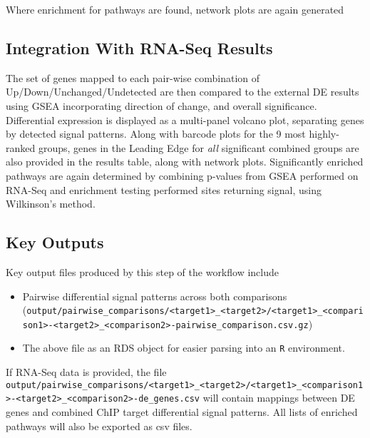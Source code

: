 \documentclass[
]{book}
\providecommand{\tightlist}{%
  \setlength{\itemsep}{0pt}\setlength{\parskip}{0pt}}
\begin{document}
Where enrichment for pathways are found, network plots are again generated

\hypertarget{integration-with-rna-seq-results}{%
\subsection*{Integration With RNA-Seq Results}\label{integration-with-rna-seq-results}}

The set of genes mapped to each pair-wise combination of Up/Down/Unchanged/Undetected are then compared to the external DE results using GSEA incorporating direction of change, and overall significance.
Differential expression is displayed as a multi-panel volcano plot, separating genes by detected signal patterns.
Along with barcode plots for the 9 most highly-ranked groups, genes in the Leading Edge for \emph{all} significant combined groups are also provided in the results table, along with network plots.
Significantly enriched pathways are again determined by combining p-values from GSEA performed on RNA-Seq and enrichment testing performed sites returning signal, using Wilkinson's method.

\hypertarget{key-outputs-2}{%
\subsection{Key Outputs}\label{key-outputs-2}}

Key output files produced by this step of the workflow include

\begin{itemize}
\tightlist
\item
  Pairwise differential signal patterns across both comparisons (\texttt{output/pairwise\_comparisons/\textless{}target1\textgreater{}\_\textless{}target2\textgreater{}/\textless{}target1\textgreater{}\_\textless{}comparison1\textgreater{}-\textless{}target2\textgreater{}\_\textless{}comparison2\textgreater{}-pairwise\_comparison.csv.gz})
\item
  The above file as an RDS object for easier parsing into an \texttt{R} environment.
\end{itemize}

If RNA-Seq data is provided, the file \texttt{output/pairwise\_comparisons/\textless{}target1\textgreater{}\_\textless{}target2\textgreater{}/\textless{}target1\textgreater{}\_\textless{}comparison1\textgreater{}-\textless{}target2\textgreater{}\_\textless{}comparison2\textgreater{}-de\_genes.csv} will contain mappings between DE genes and combined ChIP target differential signal patterns.
All lists of enriched pathways will also be exported as csv files.
\end{document}
